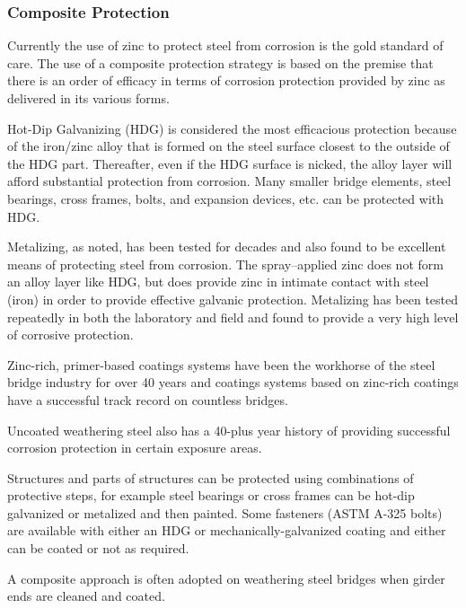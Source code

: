 \subsubsection{Composite Protection}
\label{subsubsec:composite-protection}
Currently the use of zinc to protect steel from corrosion is the gold standard of care. The use of a composite
protection strategy is based on the premise that there is an order of efficacy in terms of corrosion protection provided
by zinc as delivered in its various forms.

Hot-Dip Galvanizing (HDG) is considered the most efficacious protection because of the iron/zinc alloy that is
formed on the steel surface closest to the outside of the HDG part. Thereafter, even if the HDG surface is nicked, the
alloy layer will afford substantial protection from corrosion. Many smaller bridge elements, steel bearings, cross
frames, bolts, and expansion devices, etc. can be protected with HDG.

Metalizing, as noted, has been tested for decades and also found to be excellent means of protecting steel from
corrosion. The spray–applied zinc does not form an alloy layer like HDG, but does provide zinc in intimate contact
with steel (iron) in order to provide effective galvanic protection. Metalizing has been tested repeatedly in both the
laboratory and field and found to provide a very high level of corrosive protection.

Zinc-rich, primer-based coatings systems have been the workhorse of the steel bridge industry for over 40 years
and coatings systems based on zinc-rich coatings have a successful track record on countless bridges.

Uncoated weathering steel also has a 40-plus year history of providing successful corrosion protection in certain
exposure areas.

Structures and parts of structures can be protected using combinations of protective steps, for example steel
bearings or cross frames can be hot-dip galvanized or metalized and then painted. Some fasteners (ASTM A-325
bolts) are available with either an HDG or mechanically-galvanized coating and either can be coated or not as
required.

A composite approach is often adopted on weathering steel bridges when girder ends are cleaned and coated.

